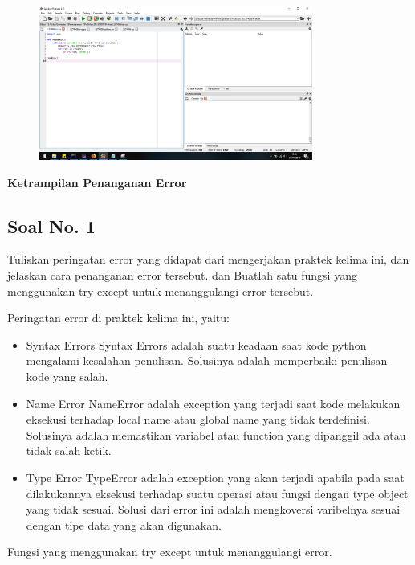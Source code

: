 \begin{figure}[H]
	\includegraphics[width=9cm]{figures/5/1174017/Praktek/csv.png}
	\centering
\end{figure}


\hfill \break
{\Large \textbf{Ketrampilan Penanganan Error}}

\subsection{Soal No. 1}
Tuliskan  peringatan  error  yang  didapat  dari  mengerjakan  praktek  kelima  ini, dan  jelaskan  cara  penanganan  error  tersebut.   dan  Buatlah  satu  fungsi  yang menggunakan try except untuk menanggulangi error tersebut.

\hfill \break
Peringatan error di praktek kelima ini, yaitu:
\begin{itemize}
	\item Syntax Errors
	Syntax Errors adalah suatu keadaan saat kode python mengalami kesalahan penulisan. Solusinya adalah memperbaiki penulisan kode yang salah.
	
	\item Name Error
	NameError adalah exception yang terjadi saat kode melakukan eksekusi terhadap local name atau global name yang tidak terdefinisi. Solusinya adalah memastikan variabel atau function yang dipanggil ada atau tidak salah ketik.
	
	\item Type Error
	TypeError adalah exception yang akan terjadi apabila pada saat dilakukannya eksekusi terhadap suatu operasi atau fungsi dengan type object yang tidak sesuai. Solusi dari error ini adalah mengkoversi varibelnya sesuai dengan tipe data yang akan digunakan.
\end{itemize}

\hfill \break
Fungsi yang menggunakan try except untuk menanggulangi error.



